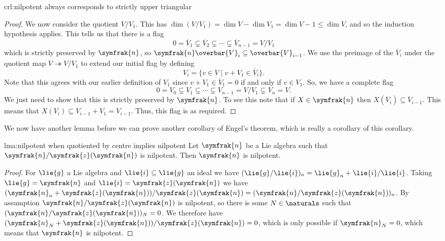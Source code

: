 \documentclass[fleqn]{NotesClass}
\newcommand{\nilpotentLie}{\symfrak{n}}
\newcommand{\centre}{\symfrak{z}}
\begin{document}
\begin{crl}{}{crl:nilpotent always corresponds to strictly upper triangular}
\begin{proof}
            We now consider the quotient \(V/V_1\).
            This has \(\dim(V/V_1) = \dim V - \dim V_1 = \dim V - 1 \le \dim V\), and so the induction hypothesis applies.
            This tells us that there is a flag
            \begin{equation}
                0 = \overbar{V}_1 \subsetneq \overbar{V}_2 \subsetneq \dotsb \subsetneq \overbar{V}_{n-1} = V/V_1
            \end{equation}
            which is strictly preserved by \(\nilpotentLie\), so \(\nilpotentLie \overbar{V}_i \subseteq \overbar{V}_{i-1}\).
            We use the preimage of the \(\overbar{V}_i\) under the quotient map \(V \twoheadrightarrow V/V_1\) to extend our initial flag by defining
            \begin{equation}
                V_i = \{v \in V \mid v + V_1 \in \overbar{V}_i\}.
            \end{equation}
            Note that this agrees with our earlier definition of \(V_1\) since \(v + V_1 \in \overbar{V}_1 = 0\) if and only if \(v \in V_1\).
            So, we have a complete flag
            \begin{equation}
                0 = V_0 \subsetneq V_1 \subsetneq \dotsb \subsetneq V_{n-1} = V/V_1 \subsetneq V_n = V.
            \end{equation}
            We just need to show that this is strictly preserved by \(\nilpotentLie\).
            To see this note that if \(X \in \nilpotentLie\) then \(X(\overbar{V}_i) \subseteq \overbar{V}_{i-1}\).
            This means that \(X(V_i) \subseteq V_{i-1} + V_1 = V_{i-1}\).
            Thus, this flag is as required.
        \end{proof}
    \end{crl}
    
    We now have another lemma before we can prove another corollary of Engel's theorem, which is really a corollary of this corollary.
    
    \begin{lma}{}{lma:nilpotent when quotiented by centre implies nilpotent}
        Let \(\nilpotentLie\) be a Lie algebra such that \(\nilpotentLie/\centre(\nilpotentLie)\) is nilpotent.
        Then \(\nilpotentLie\) is nilpotent.
        \begin{proof}
            For \(\lie{g}\) a Lie algebra and \(\lie{i} \subseteq \lie{g}\) an ideal we have \((\lie{g}/\lie{i})_n = \lie{g}_n + \lie{i}/\lie{i}\).
            Taking \(\lie{g} = \nilpotentLie\) and \(\lie{i} = \centre(\nilpotentLie)\) we have \((\nilpotentLie_n + \centre(\nilpotentLie))/\centre(\nilpotentLie) = (\nilpotentLie/\centre(\nilpotentLie))_n\).
            By assumption \(\nilpotentLie/\centre(\nilpotentLie)\) is nilpotent, so there is some \(N \in \naturals\) such that \((\nilpotentLie/\centre(\nilpotentLie))_N = 0\).
            We therefore have \((\nilpotentLie_N + \centre(\nilpotentLie))/\centre(\nilpotentLie) = 0\), which is only possible if \(\nilpotentLie_N = 0\), which means that \(\nilpotentLie\) is nilpotent.
        \end{proof}
    \end{lma}
    
\end{document}
